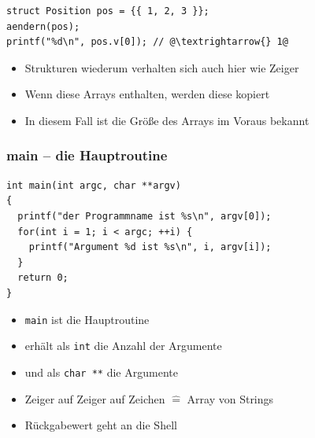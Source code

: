 \documentclass{slides}
\begin{document}
\begin{frame}[fragile]
\begin{onlyenv}
\begin{lstlisting}
struct Position pos = {{ 1, 2, 3 }};
aendern(pos);
printf("%d\n", pos.v[0]); // @\textrightarrow{} 1@
\end{lstlisting}

    \begin{itemize}
    \item Strukturen wiederum verhalten sich auch hier wie Zeiger
    \item Wenn diese Arrays enthalten, werden diese kopiert
    \item In diesem Fall ist die Größe des Arrays im Voraus bekannt
    \end{itemize}
  \end{onlyenv}
\end{frame}

\begin{frame}[fragile]
  \frametitle{main -- die Hauptroutine}

\begin{lstlisting}
int main(int argc, char **argv)
{
  printf("der Programmname ist %s\n", argv[0]);
  for(int i = 1; i < argc; ++i) {
    printf("Argument %d ist %s\n", i, argv[i]);
  }
  return 0;
}
\end{lstlisting}

  \begin{itemize}
  \item \lstinline!main! ist die Hauptroutine
  \item erhält als \lstinline!int! die Anzahl der Argumente
  \item und als \lstinline!char **! die Argumente
  \item Zeiger auf Zeiger auf Zeichen $\widehat{=}$ Array von Strings
  \item Rückgabewert geht an die Shell
  \end{itemize}
\end{frame}
\end{document}
